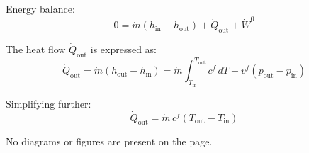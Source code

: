 Energy balance:  
\[
0 = \dot{m} (h_{\text{in}} - h_{\text{out}}) + \dot{Q}_{\text{out}} + \dot{W}^0
\]  

The heat flow \( \dot{Q}_{\text{out}} \) is expressed as:  
\[
\dot{Q}_{\text{out}} = \dot{m} (h_{\text{out}} - h_{\text{in}}) = \dot{m} \int_{T_{\text{in}}}^{T_{\text{out}}} c^f \, dT + v^f (p_{\text{out}} - p_{\text{in}})
\]  

Simplifying further:  
\[
\dot{Q}_{\text{out}} = \dot{m} \, c^f (T_{\text{out}} - T_{\text{in}})
\]  

No diagrams or figures are present on the page.